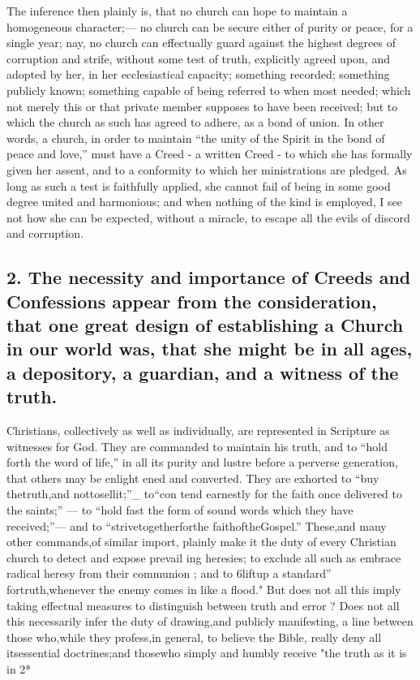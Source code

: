 \documentclass[
]{book}
\begin{document}
The inference then plainly is, that no church can hope to maintain a homogeneous character;--- no church can be secure either of purity or peace, for a single year; nay, no church can effectually guard against the highest degrees of corruption and strife, without some test of truth, explicitly agreed upon, and adopted by her, in her ecclesiastical capacity; something recorded; something publicly known; something capable of being referred to when most needed; which not merely this or that private member supposes to have been received; but to which the church as such has agreed to adhere, as a bond of union. In other words, a church, in order to maintain ``the unity of the Spirit in the bond of peace and love,'' must have a Creed - a written Creed - to which she has formally given her assent, and to a conformity to which her ministrations are pledged. As long as such a test is faithfully applied, she cannot fail of being in some good degree united and harmonious; and when nothing of the kind is employed, I see not how she can be expected, without a miracle, to escape all the evils of discord and corruption.

\hypertarget{the-necessity-and-importance-of-creeds-and-confessions-appear-from-the-consideration-that-one-great-design-of-establishing-a-church-in-our-world-was-that-she-might-be-in-all-ages-a-depository-a-guardian-and-a-witness-of-the-truth.}{%
\subsection{2. The necessity and importance of Creeds and Confessions appear from the consideration, that one great design of establishing a Church in our world was, that she might be in all ages, a depository, a guardian, and a witness of the truth.}\label{the-necessity-and-importance-of-creeds-and-confessions-appear-from-the-consideration-that-one-great-design-of-establishing-a-church-in-our-world-was-that-she-might-be-in-all-ages-a-depository-a-guardian-and-a-witness-of-the-truth.}}

Christians, collectively as well as individually, are represented in Scripture as witnesses for God. They are commanded to maintain his truth, and to ``hold forth the word of life,'' in all its purity and lustre before a perverse generation, that others may be enlight ened and converted. They are exhorted to ``buy thetruth,and nottosellit;''\_ to``con tend earnestly for the faith once delivered to the saints;'' --- to ``hold fast the form of sound words which they have received;''--- and to ``strivetogetherforthe faithoftheGospel.'' These,and many other commands,of similar import, plainly make it the duty of every Christian church to detect and expose prevail
ing heresies; to exclude all such as embrace
radical heresy from their communion ; and to
6liftup a standard'' fortruth,whenever the enemy comes in like a flood."
But does not all this imply taking effectual measures to distinguish between truth and error ? Does not all this necessarily infer the duty of drawing,and publicly manifesting, a line between those who,while they profess,in general, to believe the Bible, really deny all
itsessential doctrines;and thosewho simply and humbly receive "the truth as it is in
2*
\end{document}
